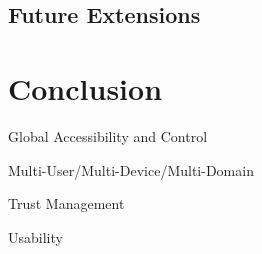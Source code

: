 \documentclass{sig-alternate}
\begin{document}
\subsection{Future Extensions}




\section{Conclusion}
\label{sec:conclusion}

Global Accessibility and Control

Multi-User/Multi-Device/Multi-Domain

Trust Management

Usability



\end{document}
